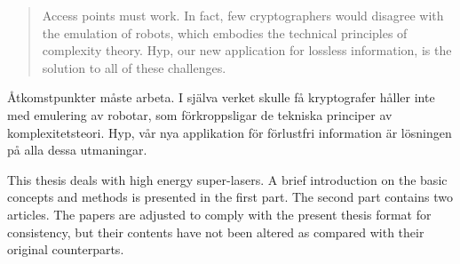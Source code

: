 %
\makecoverpage


%
\dedication{
	{\it ``All izz well.''}\\[20pt]
	From the movie ``3 idiots''
}


%
%
\begin{abstract}
	Access points  must work. In fact, few cryptographers would disagree with
	the emulation of robots, which embodies the technical principles of
	complexity theory. Hyp, our new application for lossless information, is the
	solution to all of these challenges.
\end{abstract}


%
%
\begin{abstrakt}
	\r{A}tkomstpunkter m\r{a}ste arbeta. I sj\"{a}lva verket skulle f\r{a}
	kryptografer h\r{a}ller inte med emulering av robotar, som
	f\"{o}rkroppsligar de tekniska principer av komplexitetsteori. Hyp, v\r{a}r
	nya applikation f\"{o}r f\"{o}rlustfri information är l\"{o}sningen på alla
	dessa utmaningar.
\end{abstrakt}


%
\begin{preface}
	This thesis deals with high energy super-lasers. A brief introduction on the
	basic concepts and methods is presented in the first part. The second part
	contains two articles.
	The papers are adjusted to comply with the present thesis format for
	consistency, but their contents have not been altered as compared with their
	original counterparts.
\end{preface}


